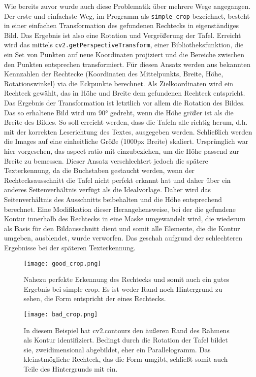 Wie bereits zuvor wurde auch diese Problematik über mehrere Wege angegangen. Der erste und einfachste Weg, im Programm als \verb|simple_crop| bezeichnet, besteht in einer einfachen Transformation des gefundenen Rechtecks in eigenständiges Bild. Das Ergebnis ist also eine Rotation und Vergrößerung der Tafel. Erreicht wird das mittels \verb|cv2.getPerspectiveTransform|, einer Bibliotheksfunktion, die ein Set von Punkten auf neue Koordinaten projiziert und die Bereiche zwischen den Punkten entsprechen transformiert. Für diesen Ansatz werden aus bekannten Kennzahlen der Rechtecke (Koordinaten des Mittelpunkts, Breite, Höhe, Rotationswinkel) via die Eckpunkte berechnet. Als Zielkoordinaten wird ein Rechteck gewählt, das in Höhe und Breite dem gefundenen Rechteck entspricht. Das Ergebnis der Transformation ist letztlich vor allem die Rotation des Bildes.
Das so erhaltene Bild wird um 90° gedreht, wenn die Höhe größer ist als die Breite des Bildes. So soll erreicht werden, dass die Tafeln alle richtig herum, d.h. mit der korrekten Leserichtung des Textes, ausgegeben werden.
Schließlich werden die Images auf eine einheitliche Größe (1000px Breite) skaliert. Ursprünglich war hier vorgesehen, das aspect ratio mit einzubeziehen, um die Höhe passend zur Breite zu bemessen. Dieser Ansatz verschlechtert jedoch die spätere Texterkennung, da die Buchstaben gestaucht werden, wenn der Rechtecksausschnitt die Tafel nicht perfekt erkannt hat und daher über ein anderes Seitenverhältnis verfügt als die Idealvorlage. Daher wird das Seitenverhältnis des Ausschnitts beibehalten und die Höhe entsprechend berechnet.
Eine Modifikation dieser Herangehensweise, bei der die gefundene Kontur innerhalb des Rechtecks in eine Maske umgewandelt wird, die wiederum als Basis für den Bildausschnitt dient und somit alle Elemente, die die Kontur umgeben, ausblendet, wurde verworfen. Das geschah aufgrund der schlechteren Ergebnisse bei der späteren Texterkennung.

\begin{SCfigure}[1][h!]
\caption{Nahezu perfekte Erkennung des Rechtecks und somit auch ein gutes Ergebnis bei simple crop. Es ist weder Rand noch Hintergrund zu sehen, die Form entspricht der eines Rechtecks.}
\texttt{[image: good\_crop.png]}
\end{SCfigure}

\begin{SCfigure}[1][h!]
\caption{In diesem Beispiel hat cv2.contours den äußeren Rand des Rahmens als Kontur identifiziert. Bedingt durch die Rotation der Tafel bildet sie, zweidimensional abgebildet, eher ein Parallelogramm. Das kleinstmögliche Rechteck, das die Form umgibt, schließt somit auch Teile des Hintergrunds mit ein.}
\texttt{[image: bad\_crop.png]}
\end{SCfigure}

